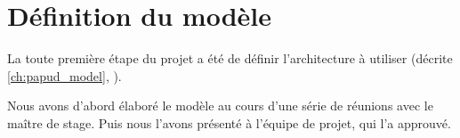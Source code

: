 \section{Définition du modèle}




La toute première étape du projet a été de définir l'architecture à utiliser (décrite \autoref{ch:papud_model}, ).

Nous avons d'abord élaboré le modèle au cours d'une série de réunions avec le maître de stage.
Puis nous l'avons présenté à l'équipe de projet, qui l'a approuvé.